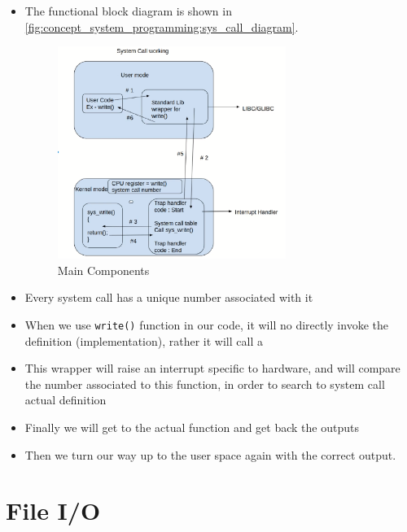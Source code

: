 \documentclass[12pt,a4paper]{book}
\begin{document}
\begin{itemize}
    
\item The functional block diagram is shown in \autoref{fig:concept_system_programming:sys_call_diagram}.

\begin{figure}[h]
\centering
\includegraphics[width = 0.7\textwidth, frame]{Figures/concept_system_programming/sys_call_diagram}
\caption{Main Components}
\label{fig:concept_system_programming:sys_call_diagram}
\end{figure}


\item Every system call has a unique number associated with it 


\item When we use \verb|write()| function in our code, it will no directly invoke the definition (implementation), rather it will call a 

\item This wrapper will raise an interrupt specific to hardware, and will compare the number associated to this function, in order to search to system call actual definition

\item Finally we will get to the actual function and get back the outputs

\item  Then we turn our way up to the user space again with the correct output.

\end{itemize}


\chapter{File I/O}
\end{document}
